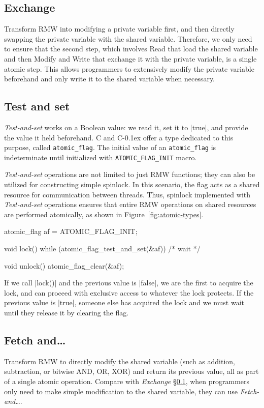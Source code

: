 \documentclass[fontsize=10pt, oneside]{scrartcl}
\newcommand{\monobox}[1]{\mbox{\texttt{#1}}}
\newcommand{\cplusplus}[1]{C\kern-0.1ex\raisebox{0.15ex}{\texttt{++}}}
\newcommand{\clang}[1]{C}
\newcommand{\fig}[1]{Figure~\ref{#1}}
\newcommand{\introduce}[1]{\textit{#1}}
\newcommand{\secref}[1]{\hyperref[#1]{\textsc{\S}\ref*{#1}}}
\begin{document}
\subsection{Exchange}
\label{exchange}
Transform \textsc{RMW} into modifying a private variable first, 
and then directly swapping the private variable with the shared variable. 
Therefore, we only need to ensure that the second step, 
which involves Read that load the shared variable and then Modify and Write that exchange it with the private variable, 
is a single atomic step.
This allows programmers to extensively modify the private variable beforehand and only write it to the shared variable when necessary. 

\subsection{Test and set}
\label{Testandset}
\introduce{Test-and-set} works on a Boolean value:
we read it, set it to \cpp|true|, and provide the value it held beforehand.
\clang{} and \cplusplus{} offer a type dedicated to this purpose, called \monobox{atomic\_flag}.
The initial value of an \monobox{atomic\_flag} is indeterminate until initialized with \monobox{ATOMIC\_FLAG\_INIT} macro.

\introduce{Test-and-set} operations are not limited to just \textsc{RMW} functions; 
they can also be utilized for constructing simple spinlock. 
In this scenario, the flag acts as a shared resource for communication between threads. 
Thus, spinlock implemented with \introduce{Test-and-set} operations ensures that entire \textsc{RMW} operations on shared resources are performed atomically, as shown in \fig{fig:atomic-types}.
\label{spinlock}
\begin{ccode}
atomic_flag af = ATOMIC_FLAG_INIT;

void lock()
{
    while (atomic_flag_test_and_set(&af)) { /* wait */ }
}

void unlock() { atomic_flag_clear(&af); }
\end{ccode}
If we call \cc|lock()| and the previous value is \cc|false|,
we are the first to acquire the lock,
and can proceed with exclusive access to whatever the lock protects.
If the previous value is \cc|true|,
someone else has acquired the lock and we must wait until they release it by clearing the flag.

\subsection{Fetch and…}
Transform \textsc{RMW} to directly modify the shared variable (such as addition, subtraction,
or bitwise \textsc{AND}, \textsc{OR}, \textsc{XOR}) and return its previous value, 
all as part of a single atomic operation. 
Compare with \introduce{Exchange} \secref{exchange}, when programmers only need to make simple modification to the shared variable, 
they can use \introduce{Fetch-and…}.
\end{document}
